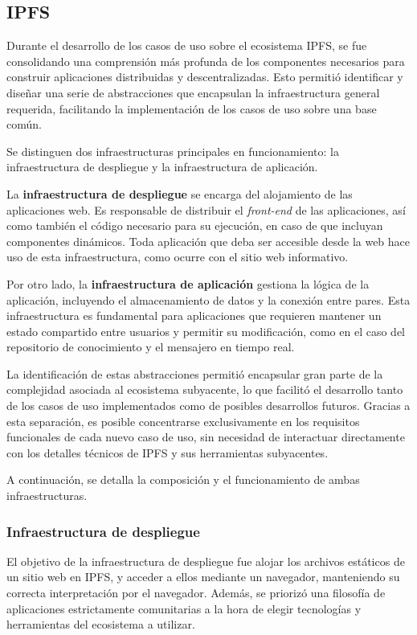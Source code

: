 \subsection{IPFS}

Durante el desarrollo de los casos de uso sobre el ecosistema IPFS, se fue consolidando una comprensión más profunda de los componentes necesarios para construir aplicaciones distribuidas y descentralizadas. Esto permitió identificar y diseñar una serie de abstracciones que encapsulan la infraestructura general requerida, facilitando la implementación de los casos de uso sobre una base común.

Se distinguen dos infraestructuras principales en funcionamiento: la infraestructura de despliegue y la infraestructura de aplicación.

La \textbf{infraestructura de despliegue} se encarga del alojamiento de las aplicaciones web. Es responsable de distribuir el \textit{front-end} de las aplicaciones, así como también el código necesario para su ejecución, en caso de que incluyan componentes dinámicos. Toda aplicación que deba ser accesible desde la web hace uso de esta infraestructura, como ocurre con el sitio web informativo.

Por otro lado, la \textbf{infraestructura de aplicación} gestiona la lógica de la aplicación, incluyendo el almacenamiento de datos y la conexión entre pares. Esta infraestructura es fundamental para aplicaciones que requieren mantener un estado compartido entre usuarios y permitir su modificación, como en el caso del repositorio de conocimiento y el mensajero en tiempo real.

La identificación de estas abstracciones permitió encapsular gran parte de la complejidad asociada al ecosistema subyacente, lo que facilitó el desarrollo tanto de los casos de uso implementados como de posibles desarrollos futuros. Gracias a esta separación, es posible concentrarse exclusivamente en los requisitos funcionales de cada nuevo caso de uso, sin necesidad de interactuar directamente con los detalles técnicos de IPFS y sus herramientas subyacentes.

A continuación, se detalla la composición y el funcionamiento de ambas infraestructuras.

\subsubsection{Infraestructura de despliegue}

El objetivo de la infraestructura de despliegue fue alojar los archivos estáticos de un sitio web en IPFS, y acceder a ellos mediante un navegador, manteniendo su correcta interpretación por el navegador. Además, se priorizó una filosofía de aplicaciones estrictamente comunitarias a la hora de elegir tecnologías y herramientas del ecosistema a utilizar.

